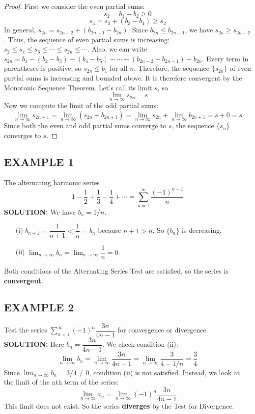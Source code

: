 \documentclass{article}
\theoremstyle{mystyle}
\begin{document}
\begin{proof}
[Proof]
First we consider the even partial sums:
\[ s_2 = b_1 - b_2 \ge 0 \]
\[ s_4 = s_2 + (b_3 - b_4) \ge s_2 \]
In general, \( s_{2n} = s_{2n-2} + (b_{2n-1} - b_{2n}) \). Since \(b_{2n} \le b_{2n-1}\), we have \(s_{2n} \ge s_{2n-2}\).
Thus, the sequence of even partial sums is increasing: \( s_2 \le s_4 \le s_6 \le \cdots \le s_{2n} \le \cdots \).
Also, we can write \( s_{2n} = b_1 - (b_2 - b_3) - (b_4 - b_5) - \cdots - (b_{2n-2} - b_{2n-1}) - b_{2n} \).
Every term in parentheses is positive, so \( s_{2n} \le b_1 \) for all \(n\).
Therefore, the sequence \(\{s_{2n}\}\) of even partial sums is increasing and bounded above. It is therefore convergent by the Monotonic Sequence Theorem. Let's call its limit \(s\), so
\[ \lim_{n\to\infty} s_{2n} = s \]
Now we compute the limit of the odd partial sums:
\[ \lim_{n\to\infty} s_{2n+1} = \lim_{n\to\infty} (s_{2n} + b_{2n+1}) = \lim_{n\to\infty} s_{2n} + \lim_{n\to\infty} b_{2n+1} = s + 0 = s \]
Since both the even and odd partial sums converge to \(s\), the sequence \(\{s_n\}\) converges to \(s\).
\end{proof}

\subsection*{EXAMPLE 1}
The alternating harmonic series
\[ 1 - \frac{1}{2} + \frac{1}{3} - \frac{1}{4} + \cdots = \sum_{n=1}^{\infty} \frac{(-1)^{n-1}}{n} \]
\textbf{SOLUTION:}
We have \(b_n = 1/n\).
\begin{itemize}
    \item[(i)] \(b_{n+1} = \dfrac{1}{n+1} < \dfrac{1}{n} = b_n\) because \(n+1 > n\). So \(\{b_n\}\) is decreasing.
    \item[(ii)] \( \lim_{n\to\infty} b_n = \lim_{n\to\infty} \dfrac{1}{n} = 0 \).
\end{itemize}
Both conditions of the Alternating Series Test are satisfied, so the series is \textbf{convergent}.

\subsection*{EXAMPLE 2}
Test the series \( \sum_{n=1}^{\infty} (-1)^n \dfrac{3n}{4n-1} \) for convergence or divergence.\\
\textbf{SOLUTION:}
Here \(b_n = \dfrac{3n}{4n-1}\). We check condition (ii):
\[ \lim_{n\to\infty} b_n = \lim_{n\to\infty} \dfrac{3n}{4n-1} = \lim_{n\to\infty} \dfrac{3}{4 - 1/n} = \dfrac{3}{4} \]
Since \( \lim_{n\to\infty} b_n = 3/4 \neq 0 \), condition (ii) is not satisfied. Instead, we look at the limit of the nth term of the series:
\[ \lim_{n\to\infty} a_n = \lim_{n\to\infty} (-1)^n \dfrac{3n}{4n-1} \]
This limit does not exist. So the series \textbf{diverges} by the Test for Divergence.
\end{document}
